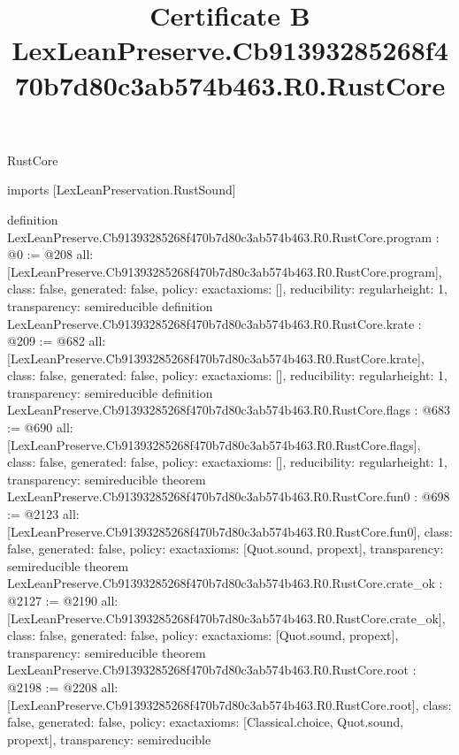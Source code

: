 \begin{lexlean}{RustCore}
\title{Certificate B LexLeanPreserve.Cb91393285268f470b7d80c3ab574b463.R0.RustCore}
\begin{coremodule}
imports [LexLeanPreservation.RustSound]

definition LexLeanPreserve.Cb91393285268f470b7d80c3ab574b463.R0.RustCore.program : @0 := @208 {
  all: [LexLeanPreserve.Cb91393285268f470b7d80c3ab574b463.R0.RustCore.program],
  class: false,
  generated: false,
  policy: exact{axioms: []},
  reducibility: regular{height: 1},
  transparency: semireducible
}
definition LexLeanPreserve.Cb91393285268f470b7d80c3ab574b463.R0.RustCore.krate : @209 := @682 {
  all: [LexLeanPreserve.Cb91393285268f470b7d80c3ab574b463.R0.RustCore.krate],
  class: false,
  generated: false,
  policy: exact{axioms: []},
  reducibility: regular{height: 1},
  transparency: semireducible
}
definition LexLeanPreserve.Cb91393285268f470b7d80c3ab574b463.R0.RustCore.flags : @683 := @690 {
  all: [LexLeanPreserve.Cb91393285268f470b7d80c3ab574b463.R0.RustCore.flags],
  class: false,
  generated: false,
  policy: exact{axioms: []},
  reducibility: regular{height: 1},
  transparency: semireducible
}
theorem LexLeanPreserve.Cb91393285268f470b7d80c3ab574b463.R0.RustCore.fun0 : @698 := @2123 {
  all: [LexLeanPreserve.Cb91393285268f470b7d80c3ab574b463.R0.RustCore.fun0],
  class: false,
  generated: false,
  policy: exact{axioms: [Quot.sound, propext]},
  transparency: semireducible
}
theorem LexLeanPreserve.Cb91393285268f470b7d80c3ab574b463.R0.RustCore.crate_ok : @2127 := @2190 {
  all: [LexLeanPreserve.Cb91393285268f470b7d80c3ab574b463.R0.RustCore.crate_ok],
  class: false,
  generated: false,
  policy: exact{axioms: [Quot.sound, propext]},
  transparency: semireducible
}
theorem LexLeanPreserve.Cb91393285268f470b7d80c3ab574b463.R0.RustCore.root : @2198 := @2208 {
  all: [LexLeanPreserve.Cb91393285268f470b7d80c3ab574b463.R0.RustCore.root],
  class: false,
  generated: false,
  policy: exact{axioms: [Classical.choice, Quot.sound, propext]},
  transparency: semireducible
}


\end{coremodule}
\end{lexlean}
